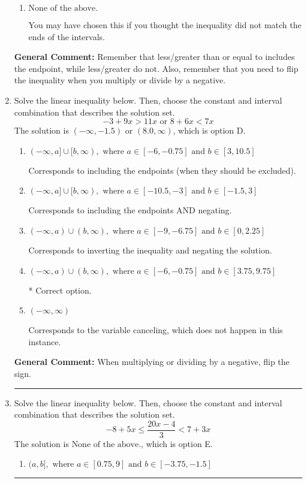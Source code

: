 \documentclass{extbook}[14pt]
\newcommand{\litem}[1]{\item #1

\rule{\textwidth}{0.4pt}}
\begin{document}
\begin{enumerate}
{\begin{enumerate}[label=\Alph*.]
* $[0.333, \infty)$, which is the correct option.
\item \( \text{None of the above}. \)

You may have chosen this if you thought the inequality did not match the ends of the intervals.
\end{enumerate}

\textbf{General Comment:} Remember that less/greater than or equal to includes the endpoint, while less/greater do not. Also, remember that you need to flip the inequality when you multiply or divide by a negative.
}
\litem{
Solve the linear inequality below. Then, choose the constant and interval combination that describes the solution set.
\[ -3 + 9 x > 11 x \text{ or } 8 + 6 x < 7 x \]The solution is \( (-\infty, -1.5) \text{ or } (8.0, \infty) \), which is option D.\begin{enumerate}[label=\Alph*.]
\item \( (-\infty, a] \cup [b, \infty), \text{ where } a \in [-6, -0.75] \text{ and } b \in [3, 10.5] \)

Corresponds to including the endpoints (when they should be excluded).
\item \( (-\infty, a] \cup [b, \infty), \text{ where } a \in [-10.5, -3] \text{ and } b \in [-1.5, 3] \)

Corresponds to including the endpoints AND negating.
\item \( (-\infty, a) \cup (b, \infty), \text{ where } a \in [-9, -6.75] \text{ and } b \in [0, 2.25] \)

Corresponds to inverting the inequality and negating the solution.
\item \( (-\infty, a) \cup (b, \infty), \text{ where } a \in [-6, -0.75] \text{ and } b \in [3.75, 9.75] \)

 * Correct option.
\item \( (-\infty, \infty) \)

Corresponds to the variable canceling, which does not happen in this instance.
\end{enumerate}

\textbf{General Comment:} When multiplying or dividing by a negative, flip the sign.
}
\litem{
Solve the linear inequality below. Then, choose the constant and interval combination that describes the solution set.
\[ -8 + 5 x \leq \frac{20 x - 4}{3} < 7 + 3 x \]The solution is \( \text{None of the above.} \), which is option E.\begin{enumerate}[label=\Alph*.]
\item \( (a, b], \text{ where } a \in [0.75, 9] \text{ and } b \in [-3.75, -1.5] \)


\end{enumerate}}
\end{enumerate}
\end{document}
